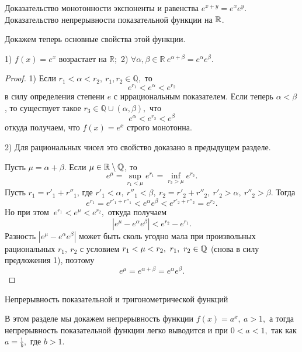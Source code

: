 \newpage

\begin{problem}
Доказательство монотонности экспоненты и равенства $e^{x+y}=e^xe^y$. Доказательство
непрерывности показательной функции на $\mathbb{R}$.
\end{problem}


Докажем теперь основные свойства этой
функции.
\begin{proposition}
    1) $f(x) = e^x$ возрастает на $\mathbb R;$
    2) $\forall \alpha, \beta \in \mathbb R
        \ e^{\alpha+\beta} = e^{\alpha}e^{\beta}$.
\end{proposition}
\begin{proof}
    1) Если $r_1 < \alpha < r_2, \ r_1, r_2 \in \mathbb Q,$
    то
    $$
        e^{r_1} < e^\alpha < e^{r_2}
    $$
    в силу
    определения степени $e$ с иррациональным
    показателем. Если теперь
    $\alpha < \beta$, то существует такое $r_3 \in
        \mathbb Q \cup(\alpha, \beta),$
    что
    $$
        e^\alpha < e^{r_3} < e^{\beta}
    $$
    откуда
    получаем, что $f(x)=e^x$ строго монотонна.

    2) Для рациональных
    чисел это свойство доказано
    в предыдущем разделе.

    Пусть $\mu = \alpha + \beta$.
    Если $\mu \in \mathbb R\setminus\mathbb{Q}$, то
    $$
        e^\mu =
        \sup\limits_{r_1<\mu} e^{r_1} =
        \inf\limits_{r_2>\mu}e^{r_2}.
    $$
    Пусть $r_1 = r'_1+r''_1$,
    где $r'_1<\alpha, \ r''_1<\beta, \ r_2 =
        r'_2+r''_2, \ r'_2 > \alpha, \ r''_2>\beta.$
    Тогда
    $$
        e^{r_1} = e^{r'_1+r''_1}<e^\alpha
        e^\beta < e^{r'_2+r''_2} = e^{r_2}.
    $$
    Но при этом
    $\ e^{r_1} < e^\mu < e^{r_2},$ откуда получаем
    $$
        |e^\mu - e^\alpha e^\beta| < e^{r_2} - e^{r_1}.
    $$
    Разность $|e^\mu - e^\alpha e^\beta|$
    может быть сколь угодно мала при произвольных
    рациональных $r_1, \ r_2$ с условием
    $r_1<\mu<r_2, \ r_1, \ r_2 \in \mathbb{Q}$
    (снова в силу предложения 1),
    поэтому
    $$
        e^\mu = e^{\alpha+\beta}=e^\alpha e^\beta.
    $$
\end{proof}
\begin{center}
    \textsf{Непрерывность показательной и тригонометрической функций}
\end{center}

В этом разделе мы докажем непрерывность
функции $f(x)=a^x, \ a>1,$ а тогда
непрерывность показательной функции легко
выводится и при $0<a<1,$ так как
$a=\frac{1}{b},$ где $b>1.$

